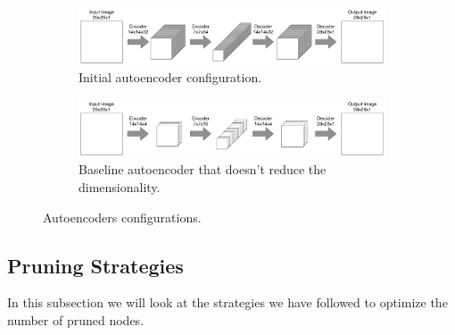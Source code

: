 \begin{figure}[!h]
    \begin{subfigure}{1\textwidth}
        \hspace{-.1\linewidth}
        \includegraphics[width=1.2\linewidth]{images/over_parameterized_autoencoder.pdf}
        \caption{Initial autoencoder configuration.}
        \label{fig:initial_autoencoder}
    \end{subfigure}
    \begin{subfigure}{1\textwidth}
        \hspace{-.1\linewidth}
        \includegraphics[width=1.2\linewidth]{images/baseline_autoencoder.pdf}
        \caption{Baseline autoencoder that doesn't reduce the dimensionality.}
        \label{fig:baseline_autoencoder}
    \end{subfigure}

    \caption{Autoencoders configurations.}
    \label{fig:autoencoders}
\end{figure}


\iffalse
\subsection{Pruning Strategies}
In this subsection we will look at the strategies we have followed to optimize the number of pruned nodes.

